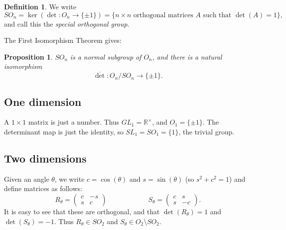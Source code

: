\documentclass{amsart}
\newcommand{\Rt}        {{\mathbb{R}^\times}}
\newcommand{\blm}       {\left(\begin{array}{cc}}
\newcommand{\elm}       {\end{array}\right)}
\newcommand{\tm}        {\times}
\newcommand{\xra}       {\xrightarrow}
\newcommand{\ov}[1]     {\overline{#1}}
\newcommand{\sm}        {\setminus}
\renewcommand{\:}{\colon}
\newtheorem{proposition}[theorem]{Proposition}
\theoremstyle{definition}
\newtheorem{definition}[theorem]{Definition}
\begin{document}
\begin{definition}\label{defn-SO}
 We write
 \[ SO_n = \ker(\det\:O_n\xra{}\{\pm 1\}) =
    \{ n\tm n \text{ orthogonal matrices } A
       \text{ such that } \det(A)=1\},
 \]
 and call this the \emph{special orthogonal group}.
\end{definition}

The First Isomorphism Theorem gives:
\begin{proposition}
 $SO_n$ is a normal subgroup of $O_n$, and there is a natural
 isomorphism
 \[ \ov{\det}\:O_n/SO_n\xra{}\{\pm 1\}. \]
\end{proposition}

\subsection{One dimension}

A $1\tm 1$ matrix is just a number.  Thus $GL_1=\Rt$, and
$O_1=\{\pm 1\}$.  The determinant map is just the identity, so
$SL_1=SO_1=\{1\}$, the trivial group.

\subsection{Two dimensions}

Given an angle $\theta$, we write $c=\cos(\theta)$ and $s=\sin(\theta)$ (so
$s^2+c^2=1$) and define matrices as follows:
\[
 R_\theta = \blm c & -s\\ s &  c\elm \hspace{6em}
 S_\theta = \blm c &  s\\ s & -c\elm.
\]
It is easy to see that these are orthogonal, and that
$\det(R_\theta)=1$ and $\det(S_\theta)=-1$.  Thus $R_\theta\in SO_2$ and
$S_\theta\in O_2\sm SO_2$.
\end{document}
